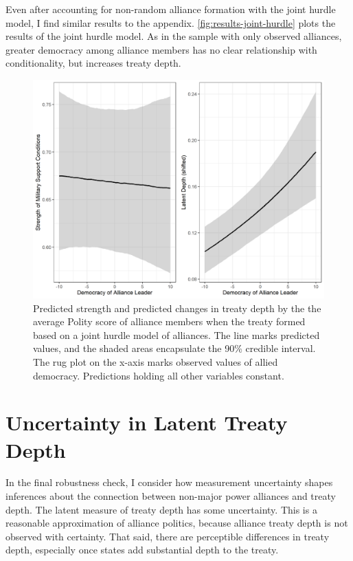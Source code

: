 \documentclass[12pt]{article}
\begin{document}
Even after accounting for non-random alliance formation with the joint hurdle model, I find similar results to the appendix. 
\autoref{fig:results-joint-hurdle} plots the results of the joint hurdle model. 
As in the sample with only observed alliances, greater democracy among alliance members has no clear relationship with conditionality, but increases treaty depth. 


\begin{figure}
\includegraphics[width=.95\textwidth]{results-joint-hurdle.png}  
\caption{Predicted strength and predicted changes in treaty depth by the the average Polity score of alliance members when the treaty formed based on a joint hurdle model of alliances. The line marks predicted values, and the shaded areas encapsulate the 90\% credible interval. The rug plot on the x-axis marks observed values of allied democracy. Predictions holding all other variables constant.}
\label{fig:results-joint-hurdle}
\end{figure}




\section{Uncertainty in Latent Treaty Depth} 


In the final robustness check, I consider how measurement uncertainty shapes inferences about the connection between non-major power alliances and treaty depth. 
The latent measure of treaty depth has some uncertainty. 
This is a reasonable approximation of alliance politics, because alliance treaty depth is not observed with certainty. 
That said, there are perceptible differences in treaty depth, especially once states add substantial depth to the treaty. 
\end{document}
